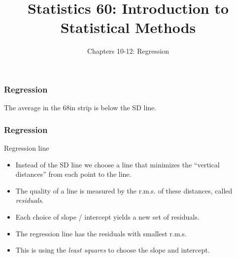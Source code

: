 \documentclass[handout]{beamer}
\title{Statistics 60: Introduction to Statistical Methods}
\subtitle{Chapters 10-12: Regression}
\author{}%
\begin{document}
   \begin{frame}
   \titlepage
   \end{frame}



   \begin{frame}
   \frametitle{Regression}
   \begin{center}
   \end{center}
   The average in the 68in strip is below the SD line.
   \end{frame}


   \begin{frame} \frametitle{Regression}

   \begin{block}
   {Regression line}

   \begin{itemize}
   \item    Instead of the SD line we choose a line that minimizes
   the ``vertical distances'' from each point to the line.

   \item The quality of a line is measured by the r.m.s.
   of these distances, called {\em \color{red} residuals}.

   \item Each choice of slope / intercept yields a new
   set of residuals.

   \item The regression line has the residuals with smallest r.m.s.

   \item This is using the {\em \color{red} least squares} to
   choose the slope and intercept.

   \end{itemize}
   \end{block}
   \end{frame}
\end{document}
